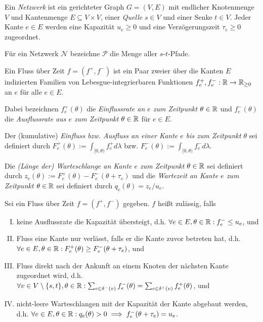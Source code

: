 \begin{definition}[Netzwerk]
	Ein \emph{Netzwerk} ist ein gerichteter Graph $G=(V,E)$ mit endlicher Knotenmenge $V$ und Kantenmenge $E\subseteq V\times V$, einer \emph{Quelle} $s\in V$ und einer Senke $t\in V$.
	Jeder Kante $e\in E$ werden eine Kapazität $u_e\geq 0$ und eine Verzögerungszeit $\tau_e\geq 0$ zugeordnet.
\end{definition}

Für ein Netzwerk $\mathcal{N}$ bezeichne $\mathcal{P}$ die Menge aller $s$-$t$-Pfade.

\begin{definition}
	Ein Fluss über Zeit $f=(f^+, f^-)$ ist ein Paar zweier über die Kanten $E$ indizierten Familien von Lebesgue-integrierbaren Funktionen $f^+_e,f^-_e: \mathbb{R} \to \mathbb{R}_{\geq 0}$ an $e$ für alle $e\in E$.
	
	Dabei bezeichnen $f_e^+(\theta)$ die \emph{Einflussrate an $e$ zum Zeitpunkt $\theta\in\mathbb{R}$} und $f_e^-(\theta)$ die \emph{Ausflussrate aus $e$ zum Zeitpunkt $\theta\in\mathbb{R}$} für $e\in E$.
	
	Der (kumulative) \emph{Einfluss bzw. Ausfluss an einer Kante $e$ bis zum Zeitpunkt $\theta$} sei definiert durch $F^+_e(\theta):=\int_{[0,\theta)} f^+_e d\lambda$ bzw. $F^-_e(\theta):=\int_{[0,\theta)} f^-_e d\lambda$.
	
	Die \emph{(Länge der) Warteschlange an Kante $e$ zum Zeitpunkt $\theta\in\mathbb{R}$} sei definiert durch $z_e(\theta):= F_e^+(\theta) - F_e^-(\theta + \tau_e)$ und die \emph{Wartezeit an Kante $e$ zum Zeitpunkt $\theta\in\mathbb{R}$} sei definiert durch $q_e(\theta) = z_e / u_e$.
\end{definition}

\begin{definition}
	Sei ein Fluss über Zeit $f=(f^+, f^-)$ gegeben. $f$ heißt zulässig, falls
	\begin{enumerate}[(I)]
		\item keine Ausflussrate die Kapazität übersteigt, d.h. $\forall e\in E, \theta\in\mathbb{R}: f_e^-\leq u_e$, und
		\item\label{weak} Fluss eine Kante nur verlässt, falls er die Kante zuvor betreten hat, d.h. $\forall e\in E, \theta\in\mathbb{R}: F_e^+(\theta) \geq F_e^-(\theta + \tau_e)$, und
		\item Fluss direkt nach der Ankunft an einem Knoten der nächsten Kante zugeordnet wird, d.h. $\forall v\in V\setminus \{ s, t \}, \theta\in\mathbb{R}: \sum_{e\in\delta^-(v)}f^-_e(\theta) = \sum_{e\in\delta^+(v)} f_e^+(\theta)$, und
		\item\label{queue-with-capacity} nicht-leere Warteschlangen mit der Kapazität der Kante abgebaut werden, d.h. $\forall e\in E, \theta\in\mathbb{R}: q_e(\theta) > 0 \implies f_e^-(\theta + \tau_e) = u_e$.
	\end{enumerate}
\end{definition}

